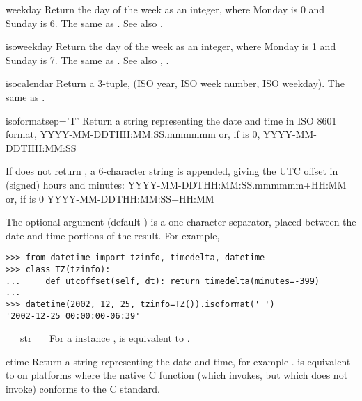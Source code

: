 \begin{methoddesc}{weekday}{}
  Return the day of the week as an integer, where Monday is 0 and
  Sunday is 6.  The same as .
  See also .
\end{methoddesc}

\begin{methoddesc}{isoweekday}{}
  Return the day of the week as an integer, where Monday is 1 and
  Sunday is 7.  The same as .
  See also , .
\end{methoddesc}

\begin{methoddesc}{isocalendar}{}
  Return a 3-tuple, (ISO year, ISO week number, ISO weekday).  The
  same as .
\end{methoddesc}

\begin{methoddesc}{isoformat}{sep='T'}
  Return a string representing the date and time in ISO 8601 format,
      YYYY-MM-DDTHH:MM:SS.mmmmmm
  or, if  is 0,
      YYYY-MM-DDTHH:MM:SS

  If  does not return , a 6-character
  string is appended, giving the UTC offset in (signed) hours and
  minutes:
      YYYY-MM-DDTHH:MM:SS.mmmmmm+HH:MM
  or, if  is 0
      YYYY-MM-DDTHH:MM:SS+HH:MM

  The optional argument  (default ) is a
  one-character separator, placed between the date and time portions
  of the result.  For example,

\begin{verbatim}
>>> from datetime import tzinfo, timedelta, datetime
>>> class TZ(tzinfo):
...     def utcoffset(self, dt): return timedelta(minutes=-399)
...
>>> datetime(2002, 12, 25, tzinfo=TZ()).isoformat(' ')
'2002-12-25 00:00:00-06:39'
\end{verbatim}
\end{methoddesc}

\begin{methoddesc}{__str__}{}
  For a  instance ,  is
  equivalent to .
\end{methoddesc}

\begin{methoddesc}{ctime}{}
  Return a string representing the date and time, for example
  .
   is equivalent to
   on platforms where
  the native C  function (which
   invokes, but which
   does not invoke) conforms to the C
  standard.
\end{methoddesc}

